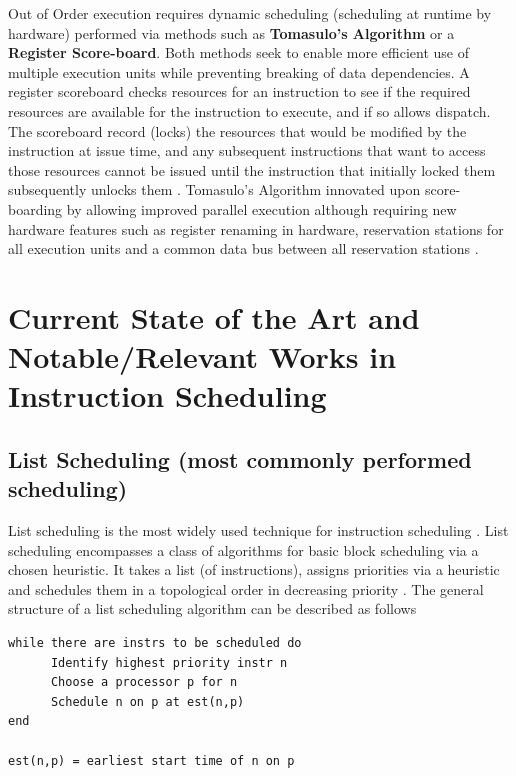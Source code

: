 \documentclass[12pt]{report}
\def\mytitle{??? Program Code ???}
\begin{document}
Out of Order execution requires dynamic scheduling (scheduling at runtime by
hardware) performed via methods such as \textbf{Tomasulo's Algorithm} or a \textbf{Register
Score-board}. Both methods seek to enable more efficient use of multiple
execution units while preventing breaking of data dependencies. A register
scoreboard checks resources for an instruction to see if the required
resources are available for the instruction to execute, and if so allows
dispatch. The scoreboard record (locks) the resources that would be modified
by the instruction at issue time, and any subsequent instructions that want to
access those resources cannot be issued until the instruction that initially
locked them subsequently unlocks them \parencite{popescu1997processor}.
Tomasulo's Algorithm innovated upon score-boarding by allowing improved parallel
execution although requiring new hardware features such as register renaming
in hardware, reservation stations for all execution units and a common data
bus between all reservation stations \parencite{tomasulo1967efficient}.

\chapter{Current State of the Art and Notable/Relevant Works in Instruction Scheduling}
\label{sec:org92f978c}
\section{List Scheduling (most commonly performed scheduling)}
\label{sec:org10c186c}
List scheduling is the most widely used technique for instruction scheduling
\parencite{gibbons1986efficient}. List scheduling encompasses a class of
algorithms for basic block scheduling via a chosen heuristic. It takes a list (of
instructions), assigns priorities via a heuristic and schedules them in a
topological order in decreasing priority \parencite{wang2018list}. The
general structure of a list scheduling algorithm can be described as follows

\def\mytitle{{\sc Basic Structure of List Scheduling Algorithms \hspace{12em} \color{grey}{.} }}
\begin{verbatim}
while there are instrs to be scheduled do 
      Identify highest priority instr n
      Choose a processor p for n
      Schedule n on p at est(n,p)
end

est(n,p) = earliest start time of n on p
\end{verbatim}
\end{document}
